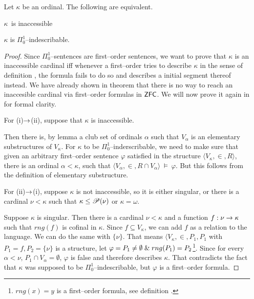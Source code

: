 \begin{theorem}
Let $\kappa$ be an ordinal. The following are equivalent.
\bce[(i)]
\item $\kappa$ is inaccessible
\item $\kappa$ is $\Pi^1_0$–indescribable.
\ece
\end{theorem}



\begin{proof}
Since $\Pi^1_0$–sentences are first–order sentences, we want to prove that $\kappa$ is an inaccessible cardinal iff whenever a first–order tries to describe $\kappa$ in the sense of definition , the formula fails to do so and describes a initial segment thereof instead.
We have already shown in theorem  that there is no way to reach an inaccesible cardinal via first–order formulas in $\sf{ZFC}$. We will now prove it again in for formal clarity.

For (i)$\rightarrow$(ii), suppose that $\kappa$ is inaccessible.

Then there is, by lemma  a club set of ordinals $\alpha$ such that $V_\alpha$ is an elementary substructures of $V_\kappa$. 
For $\kappa$ to be $\Pi^1_0$–inderscribable, we need to make sure that given an arbitrary first–order sentence $\varphi$ satisfied in the structure $\langle V_\kappa, \in, R \rangle$, there is an ordinal $\alpha < \kappa$, such that $\langle V_\alpha, \in, R \cap V_\alpha \rangle~\models~\varphi$. But this follows from the definition of elementary substructure.

For (ii)$\rightarrow$(i), suppose $\kappa$ is not inaccessible, so it is either singular, or there is a cardinal $\nu < \kappa$ such that $\kappa \leq \mathscr{P} (\nu)$ or $\kappa=\omega$. 


Suppose $\kappa$ is singular. Then there is a cardinal $\nu < \kappa$ and a function $f: \nu \rightarrow \kappa$ such that $rng(f)$ is cofinal in $\kappa$. Since $f \subseteq V_\kappa$, we can add $f$ as a relation to the language. We can do the same with $\{\nu\}$. That means $\langle V_\kappa, \in, P_1, P_1$ with $P_1 = f, P_2 = \{\nu\}$ is a structure, 
let $\varphi = P_1 \neq \emptyset \mathrel{\&} rng(P_1) = P_2$\footnote{$rng(x)=y$ is a first–order formula, see definition .}. Since for every $\alpha < \nu$, $P_1 \cap V_\alpha = \emptyset$, $\varphi$ is false and therefore describes $\kappa$. That contradicts the fact that $\kappa$ was supposed to be $\Pi^1_0$–indescribable, but $\varphi$ is a first–order formula.


\end{proof}
